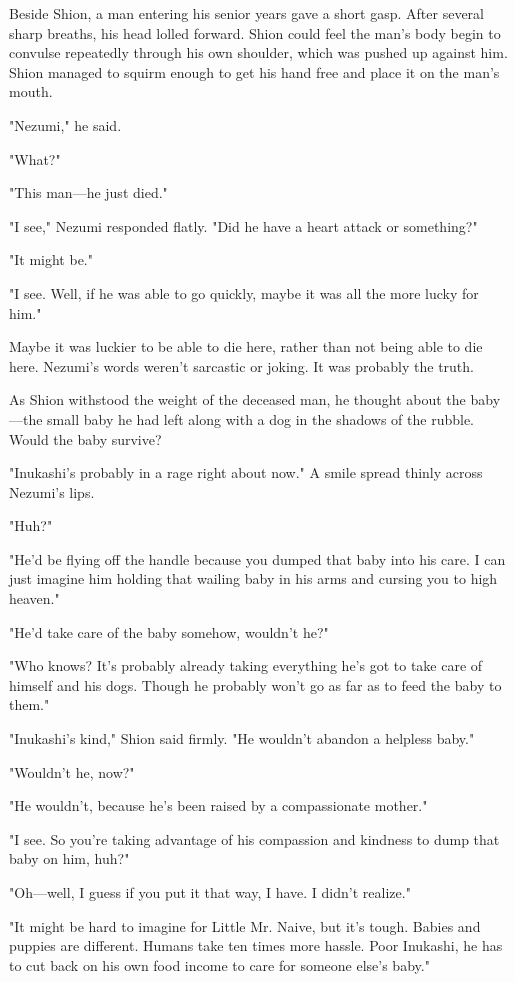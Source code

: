 Beside Shion, a man entering his senior years gave a short gasp. After
several sharp breaths, his head lolled forward. Shion could feel the
man's body begin to convulse repeatedly through his own shoulder, which
was pushed up against him. Shion managed to squirm enough to get his
hand free and place it on the man's mouth.

"Nezumi," he said.

"What?"

"This man---he just died."

"I see," Nezumi responded flatly. "Did he have a heart attack or
something?"

"It might be."

"I see. Well, if he was able to go quickly, maybe it was all the more
lucky for him."

Maybe it was luckier to be able to die here, rather than not being able
to die here. Nezumi's words weren't sarcastic or joking. It was probably
the truth.

As Shion withstood the weight of the deceased man, he thought about the
baby---the small baby he had left along with a dog in the shadows of the
rubble. Would the baby survive?

"Inukashi's probably in a rage right about now." A smile spread thinly
across Nezumi's lips.

"Huh?"

"He'd be flying off the handle because you dumped that baby into his
care. I can just imagine him holding that wailing baby in his arms and
cursing you to high heaven."

"He'd take care of the baby somehow, wouldn't he?"

"Who knows? It's probably already taking everything he's got to take
care of himself and his dogs. Though he probably won't go as far as to
feed the baby to them."

"Inukashi's kind," Shion said firmly. "He wouldn't abandon a helpless
baby."

"Wouldn't he, now?"

"He wouldn't, because he's been raised by a compassionate mother."

"I see. So you're taking advantage of his compassion and kindness to
dump that baby on him, huh?"

"Oh---well, I guess if you put it that way, I have. I didn't realize."

"It might be hard to imagine for Little Mr. Naive, but it's tough.
Babies and puppies are different. Humans take ten times more hassle.
Poor Inukashi, he has to cut back on his own food income to care for
someone else's baby."

